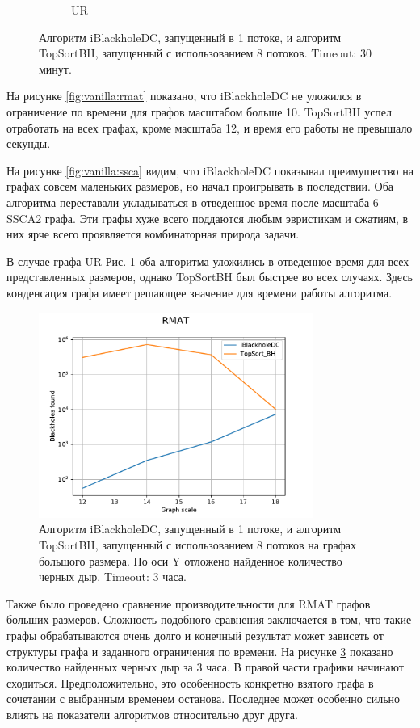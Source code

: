 \documentclass[12pt,a4paper,oneside,openany]{article}
\theoremstyle{definition}
\theoremstyle{lemma}
\theoremstyle{remark}
\begin{document}
\begin{figure}[H]
\begin{subfigure}{.5\textwidth}
      \caption{UR}
      \label{fig:vanilla:ur}
    \end{subfigure}
    \caption{Алгоритм iBlackholeDC, запущенный в 1 потоке, и алгоритм TopSortBH, запущенный с использованием 8 потоков. Timeout: 30 минут.}
    \label{fig:vanilla}
\end{figure}

На рисунке \ref{fig:vanilla:rmat} показано, что iBlackholeDC не уложился в ограничение по времени для графов масштабом больше 10.
TopSortBH успел отработать на всех графах, кроме масштаба 12, и время его работы не превышало секунды.

На рисунке \ref{fig:vanilla:ssca} видим, что iBlackholeDC показывал преимущество на графах совсем маленьких размеров, но начал проигрывать в последствии.
Оба алгоритма переставали укладываться в отведенное время после масштаба 6 SSCA2 графа. Эти графы хуже всего поддаются любым эвристикам и сжатиям,
в них ярче всего проявляется комбинаторная природа задачи.

В случае графа UR Рис. \ref{fig:vanilla:ur} оба алгоритма уложились в отведенное время для всех представленных размеров, однако TopSortBH был быстрее во всех
случаях. Здесь конденсация графа имеет решающее значение для времени работы алгоритма.

\begin{figure}[H]
    \centering
    \includegraphics[width=0.8\textwidth]{images/1_large_RMAT.pdf}
    \caption{Алгоритм iBlackholeDC, запущенный в 1 потоке, и алгоритм TopSortBH, запущенный с использованием 8 потоков на графах большого размера.
По оси Y отложено найденное количество черных дыр. Timeout: 3 часа.}
    \label{fig:vanillalarge}
\end{figure}

Также было проведено сравнение производительности для RMAT графов больших размеров. Сложность подобного сравнения заключается в том,
что такие графы обрабатываются очень долго и конечный результат может зависеть от структуры графа и заданного ограничения по времени.
На рисунке \ref{fig:vanillalarge} показано количество найденных черных дыр за 3 часа. В правой части графики начинают сходиться.
Предположительно, это особенность конкретно взятого графа в сочетании с выбранным временем останова. Последнее может особенно сильно влиять
на показатели алгоритмов относительно друг друга.
\end{document}
